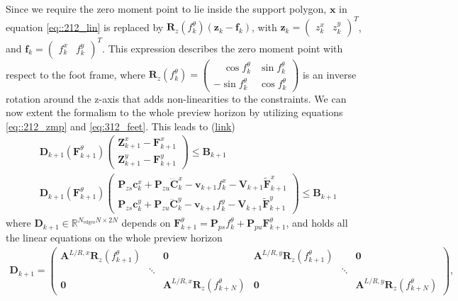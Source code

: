 Since we require the zero moment point to lie inside the support polygon, $\bm{x}$ in equation \ref{eq::212_lin} is replaced by $\bm{R}_z(f_k^\theta)(\bm{z}_k-\bm{f}_k)$, with $\bm{z}_k=\begin{pmatrix}
z_k^x & z_k^y
\end{pmatrix}^T$, and $\bm{f}_k=\begin{pmatrix}
f_k^x & f_k^y
\end{pmatrix}^T$. This expression describes the zero moment point with respect to the foot frame, where $\bm{R}_z(f_k^\theta) = \begin{pmatrix}
\quad\cos f_k^\theta & \sin f_k^\theta \\
-\sin f_k^\theta& \cos f_k^\theta
\end{pmatrix}$ is an inverse rotation around the z-axis that adds non-linearities to the constraints. We can now extent the formalism to the whole preview horizon by utilizing equations \ref{eq::212_zmp} and \ref{eq:312_feet}. This leads to (\href{https://github.com/mhubii/nmpc_pattern_generator/blob/5a213044c927dc6aac9f7e32ce1e5fb472cd67bb/libs/pattern_generator/src/base_generator.cpp#L946}{\underline{link}})
\begin{align}
	&\bm{D}_{k+1}(\bm{F}_{k+1}^{\theta})\begin{pmatrix}
		\bm{Z}_{k+1}^x - \bm{F}_{k+1}^x \\
		\bm{Z}_{k+1}^y - \bm{F}_{k+1}^y
	\end{pmatrix} \leq \bm{B}_{k+1} \\
	&\bm{D}_{k+1}(\bm{F}_{k+1}^{\theta})\begin{pmatrix}
		\bm{P}_{zs} \bm{c}_k^x + \bm{P}_{zu}\dddot{\bm{C}}_k^x - \bm{v}_{k+1}f_k^x-\bm{V}_{k+1}\tilde{\bm{F}}_{k+1}^x \\
		\bm{P}_{zs} \bm{c}_k^y + \bm{P}_{zu}\dddot{\bm{C}}_k^y - \bm{v}_{k+1}f_k^y-\bm{V}_{k+1}\tilde{\bm{F}}_{k+1}^y
	\end{pmatrix} \leq \bm{B}_{k+1}
	\label{eq::212_cop_hull}
\end{align}
where $\bm{D}_{k+1}\in\mathbb{R}^{N_\text{edges}N\times2N}$ depends on $\bm{F}_{k+1}^{\theta} = \bm{P}_{ps}f_k^\theta + \bm{P}_{pu}\bm{F}_{k+1}^\theta$, and holds all the linear equations on the whole preview horizon \begin{align}
\bm{D}_{k+1} = \begin{pmatrix}
	\bm{A}^{L/R,x}\bm{R}_z(f_{k+1}^\theta)&                  &\bm{0}                 &\bm{A}^{L/R,y}\bm{R}_z(f_{k+1}^\theta)&      &\bm{0} \\
	                  &\ddots            &                  &                  &\ddots& \\
	\bm{0}                 &                  &\bm{A}^{L/R,x}\bm{R}_z(f_{k+N}^\theta)&\bm{0}                 &      &\bm{A}^{L/R,y}\bm{R}_z(f_{k+N}^\theta)
\end{pmatrix},
\label{eq::212_rot1}
\end{align}
